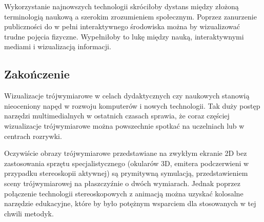 Wykorzystanie najnowszych technologii skróciłoby dystans między złożoną terminologią naukową a szerokim zrozumieniem społecznym. Poprzez zanurzenie publiczności do w pełni interaktywnego środowiska można by wizualizować trudne pojęcia fizyczne. Wypełniłoby to lukę między nauką, interaktywnymi mediami i wizualizacją informacji.

\subsection{Zakończenie}
Wizualizacje trójwymiarowe w celach dydaktycznych czy naukowych stanowią nieoceniony napęd w rozwoju komputerów i nowych technologii.   Tak duży postęp narzędzi multimedialnych w ostatnich czasach sprawia, że coraz częściej wizualizacje trójwymiarowe można powszechnie spotkać na uczelniach lub w centrach rozrywki.

Oczywiście obrazy trójwymiarowe przedstawiane na zwykłym ekranie 2D bez zastosowania sprzętu specjalistycznego (okularów 3D, emitera podczerwieni w przypadku stereoskopii aktywnej) są prymitywną symulacją, przedstawieniem sceny trójwymiarowej na płaszczyźnie o dwóch wymiarach. Jednak poprzez połączenie technologii stereoskopowych z animacją można uzyskać kolosalne narzędzie edukacyjne, które by było potężnym wsparciem dla stosowanych w tej chwili metodyk. 

\newpage

\newpage
\listoffigures

\newpage
\listoftables

\newpage
\listofappendix

